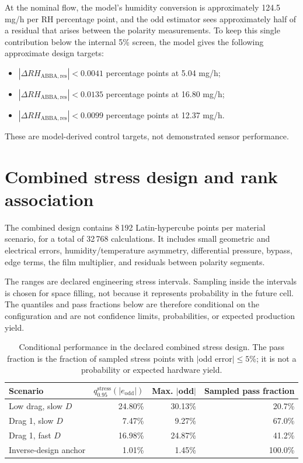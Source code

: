 \documentclass[10pt,a4paper]{article}
\begin{document}
At the nominal flow, the model's humidity conversion is approximately
124.5 mg/h per RH percentage point, and the odd estimator sees approximately
half of a residual that arises between the polarity measurements. To keep this
single contribution below the internal 5\% screen, the model gives the
following approximate design targets:

\begin{itemize}
  \item $|\Delta RH_{\mathrm{ABBA,res}}|<0.0041$ percentage points at 5.04 mg/h;
  \item $|\Delta RH_{\mathrm{ABBA,res}}|<0.0135$ percentage points at 16.80 mg/h;
  \item $|\Delta RH_{\mathrm{ABBA,res}}|<0.0099$ percentage points at 12.37 mg/h.
\end{itemize}

These are model-derived control targets, not demonstrated sensor performance.
\FloatBarrier

\section{Combined stress design and rank association}

The combined design contains 8\,192 Latin-hypercube points per material
scenario, for a total of 32\,768 calculations. It includes small geometric and
electrical errors, humidity/temperature asymmetry, differential pressure,
bypass, edge terms, the film multiplier, and residuals between polarity
segments.

\begin{warningbox}
The ranges are declared engineering stress intervals. Sampling inside the
intervals is chosen for space filling, not because it represents probability
in the future cell. The quantiles and pass fractions below are therefore
conditional on the configuration and are not confidence limits,
probabilities, or expected production yield.
\end{warningbox}

\begin{table}[htbp]
\centering
\caption{Conditional performance in the declared combined stress design. The pass fraction is the fraction of sampled stress points with $|$odd error$|\leq5$\%; it is not a probability or expected hardware yield.}
\begin{tabularx}{\textwidth}{@{}Yrrr@{}}
\toprule
\textbf{Scenario} & $q_{0.95}^{\mathrm{stress}}(|e_{\mathrm{odd}}|)$ & \textbf{Max. $|$odd$|$} & \textbf{Sampled pass fraction} \\
\midrule
Low drag, slow $D$ & 24.80\% & 30.13\% & 20.7\% \\
Drag 1, slow $D$ & 7.47\% & 9.27\% & 67.0\% \\
Drag 1, fast $D$ & 16.98\% & 24.87\% & 41.2\% \\
Inverse-design anchor & 1.01\% & 1.45\% & 100.0\% \\
\bottomrule
\end{tabularx}
\end{table}
\end{document}
